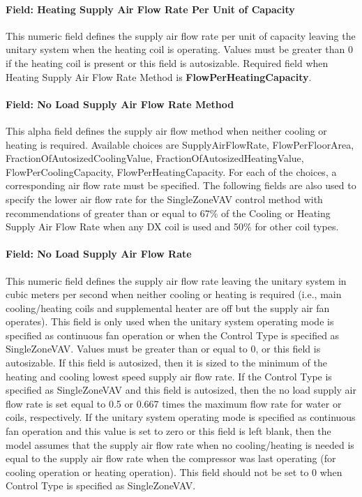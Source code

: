 \paragraph{Field: Heating Supply Air Flow Rate Per Unit of Capacity}\label{field-heating-supply-air-flow-rate-per-unit-of-capacity}

This numeric field defines the supply air flow rate per unit of capacity leaving the unitary system when the heating coil is operating. Values must be greater than 0 if the heating coil is present or this field is autosizable. Required field when Heating Supply Air Flow Rate Method is \textbf{FlowPerHeatingCapacity}.

\paragraph{Field: No Load Supply Air Flow Rate Method}\label{field-no-load-supply-air-flow-rate-method}

This alpha field defines the supply air flow method when neither cooling or heating is required. Available choices are SupplyAirFlowRate, FlowPerFloorArea, FractionOfAutosizedCoolingValue, FractionOfAutosizedHeatingValue, FlowPerCoolingCapacity, FlowPerHeatingCapacity. For each of the choices, a corresponding air flow rate must be specified. The following fields are also used to specify the lower air flow rate for the SingleZoneVAV control method with recommendations of greater than or equal to 67\% of the Cooling or Heating Supply Air Flow Rate when any DX coil is used and 50\% for other coil types.

\paragraph{Field: No Load Supply Air Flow Rate}\label{field-no-load-supply-air-flow-rate-000}

This numeric field defines the supply air flow rate leaving the unitary system in cubic meters per second when neither cooling or heating is required (i.e., main cooling/heating coils and supplemental heater are off but the supply air fan operates). This field is only used when the unitary system operating mode is specified as continuous fan operation or when the Control Type is specified as SingleZoneVAV. Values must be greater than or equal to 0, or this field is autosizable. If this field is autosized, then it is sized to the minimum of the heating and cooling lowest speed supply air flow rate. If the Control Type is specified as SingleZoneVAV and this field is autosized, then the no load supply air flow rate is set equal to 0.5 or 0.667 times the maximum flow rate for water or coils, respectively. If the unitary system operating mode is specified as continuous fan operation and this value is set to zero or this field is left blank, then the model assumes that the supply air flow rate when no cooling/heating is needed is equal to the supply air flow rate when the compressor was last operating (for cooling operation or heating operation). This field should not be set to 0 when Control Type is specified as SingleZoneVAV.


